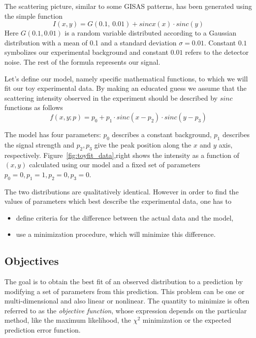 The scattering picture, similar to some GISAS patterns, has been generated using the simple function
$$I(x,y) = G(0.1,~0.01) + sincx(x) \cdot sinc(y)$$
Here $G(0.1, 0.01)$ is a random variable distributed according to a Gaussian distribution
with a mean of 0.1 and a standard deviation $\sigma=0.01$.
Constant $0.1$ symbolizes our experimental background and constant $0.01$ refers
to the detector noise. The rest of the formula represents our signal.

Let's define our model, namely specific mathematical functions, to
which we will fit our toy experimental data. By making an educated
guess we assume that the scattering intensity observed
in the experiment should be described by $sinc$ functions as follows
\begin{equation} \label{eq:toy_model}
f(x,y;p) = p_0 + p_1 \cdot  sinc(x - p_2) \cdot sinc(y - p_3)
\end{equation}

The model has four parameters: $p_0$ describes a constant background,
$p_{1}$ describes the signal strength
and $p_2,p_3$ give the peak position along the $x$ and $y$ axis, respectively.
Figure~\ref{fig:toyfit_data},right shows the intensity as a function
of $(x,y)$ calculated using  our model and a fixed set of parameters 
$p_0=0, p_1=1, p_2=0, p_3=0$. 

The two distributions are qualitatively identical. However in order to find the
values of parameters which best describe the experimental data, one has to
\begin{itemize}
\item define criteria for the difference between the actual data and the model,
\item use a minimization procedure, which will minimize this difference.
\end{itemize}


\subsection{Objectives}

The goal is to obtain the best fit of an observed distribution
to a prediction by modifying a set of parameters from this
prediction. This problem can be one or multi-dimensional and also linear or
nonlinear. The quantity to minimize is often referred to as the
\textit{objective function}, whose expression depends on the
particular method, like the maximum likelihood, the $\chi^2$
minimization or the expected prediction error function. 

